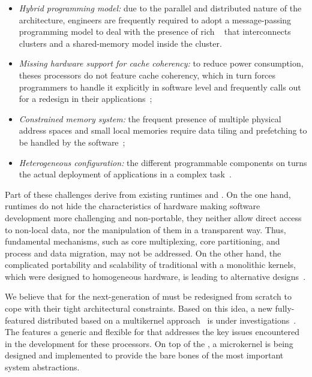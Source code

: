 	\begin{itemize}
		\item \textit{Hybrid programming model:} due to the parallel and
		distributed nature of the architecture, engineers are frequently
		required to adopt a message-passing programming model to deal
		with the presence of rich \nocs~\cite{kelly2013} that
		interconnects clusters and a shared-memory model inside the
		cluster.

		\item \textit{Missing hardware support for cache coherency:} to
		reduce power consumption, theses processors do not feature cache
		coherency, which in turn forces programmers to handle it
		explicitly in software level and frequently calls out for a
		redesign in their applications~\cite{francesquini2015};

		\item \textit{Constrained memory system:} the frequent presence
		of multiple physical address spaces and small local memories
		require data tiling and prefetching to be handled by the
		software~\cite{Castro2016};

		\item \textit{Heterogeneous configuration:} the different
		programmable components on \lightweight \manycores turns the
		actual deployment of applications in a complex
		task~\cite{barbalace2015}.
	\end{itemize}

	Part of these challenges derive from existing runtimes and \oss.
	On the one hand, runtimes do not hide the characteristics of hardware
	making software development more challenging and non-portable, \eg they
	neither allow direct access to non-local data, nor the manipulation of
	them in a transparent way. Thus, fundamental \os mechanisms, such
	as core multiplexing, core partitioning, and process and data
	migration, may not be addressed. On the other hand, the complicated
	portability and scalability of traditional \oss with a monolithic
	kernels, which were designed to homogeneous hardware, is leading to
	alternative \os designs~\cite{Baumann2009, kluge2014, nightingale2009, rhoden2011}.

	We believe that \oss for the next-generation of \lightweight
	\manycores must be redesigned from scratch to cope with their tight
	architectural constraints. Based on this idea, a new fully-featured
	distributed \os based on a multikernel approach~\cite{Baumann2009}
	is under investigations~\cite{penna2017-1,penna2017-2,penna2019}.
	The \nanvix \multikernel features a generic and flexible \hal for
	\lightweight \manycores that addresses the key issues encountered in
	the development for these processors. On top of the \nanvix
	\textit{\hal}, a microkernel is being designed and implemented
	to provide the bare bones of the most important system abstractions.

